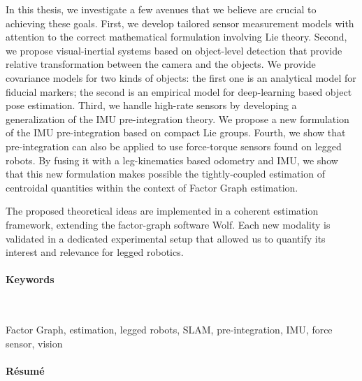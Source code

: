 In this thesis, we investigate a few avenues that we believe are crucial to achieving these goals. First, we develop tailored sensor measurement models 
with attention to the correct mathematical formulation involving Lie theory.
Second, we propose visual-inertial systems based on object-level detection that provide relative transformation between the camera and the objects.
We provide covariance models for two kinds of objects: the first one is an analytical model for fiducial markers; the second
is an empirical model for deep-learning based object pose estimation.
Third, we handle high-rate sensors by developing a generalization of the IMU pre-integration theory. We propose a new formulation of the IMU
pre-integration based on compact Lie groups. 
Fourth, we show that pre-integration can also be applied to use force-torque sensors found on legged robots. 
By fusing it with a leg-kinematics based odometry and IMU, we show that this new formulation makes possible the tightly-coupled estimation
of centroidal quantities within the context of Factor Graph estimation.

The proposed theoretical ideas are implemented in a coherent estimation framework, extending the factor-graph software Wolf. Each new modality is 
validated in a dedicated experimental setup that allowed us to quantify its interest and relevance for legged robotics.



\paragraph{Keywords}~

Factor Graph, estimation, legged robots, SLAM, pre-integration, IMU, force sensor, vision 

\noindent\makebox[\linewidth]{\rule{0.6\textwidth}{2pt}}



\newpage


\noindent\makebox[\linewidth]{\rule{0.6\textwidth}{2pt}}


\paragraph{Résumé}~

